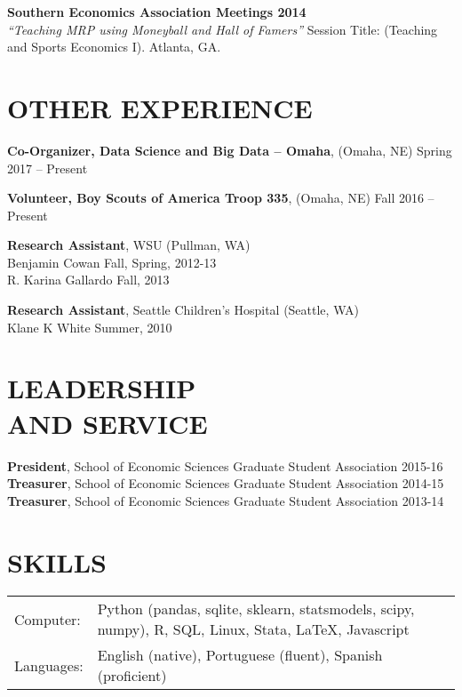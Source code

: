 \documentclass[margin]{res}  %
\begin{document}
\begin{resume}
\textbf{Southern Economics Association Meetings 2014}\\
\emph{``Teaching MRP using Moneyball and Hall of Famers''}
Session Title: (Teaching and Sports Economics I). Atlanta, GA. %


\section{\textnormal{OTHER EXPERIENCE}}

\textbf{Co-Organizer, Data Science and Big Data -- Omaha}, (Omaha, NE) \hfill Spring 2017 -- Present

\textbf{Volunteer, Boy Scouts of America Troop 335}, (Omaha, NE) \hfill Fall 2016 -- Present

\textbf{Research Assistant}, WSU (Pullman, WA) \\
Benjamin Cowan \hfill Fall, Spring, 2012-13\\
R. Karina Gallardo \hfill Fall, 2013

\textbf{Research Assistant}, Seattle Children's Hospital (Seattle, WA) \\
Klane K White \hfill Summer, 2010



\section{\textnormal{LEADERSHIP\\ AND SERVICE}} 
  
\textbf{President}, School of Economic Sciences Graduate Student Association \hfill 2015-16\\
\textbf{Treasurer}, School of Economic Sciences Graduate Student Association \hfill 2014-15\\
\textbf{Treasurer}, School of Economic Sciences Graduate Student Association \hfill 2013-14\\

\section{\textnormal{SKILLS}}
   \begin{tabular}{l p{3in}}
       Computer: &  Python (pandas, sqlite, sklearn, statsmodels, scipy, numpy), R, SQL, Linux, Stata, \LaTeX, Javascript \\[12pt]
        Languages: & English (native), Portuguese (fluent), Spanish (proficient)
 \end{tabular}
\\


\end{resume}
\end{document}

